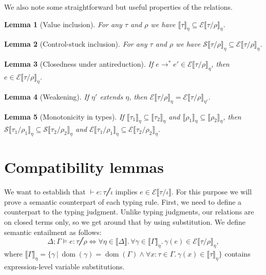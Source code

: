 \documentclass[a4paper, 11pt,titlepage, openright, twoside]{report}
\newcommand{\E}{\mathcal{E}}
\renewcommand{\S}{\mathcal{S}}
\newcommand{\Free}{\textrm{-}\mathrm{free}}
\DeclareMathOperator{\dom}{dom}
\newcommand{\+}{\enspace}
\newtheorem{lemma}{Lemma}
\begin{document}
We also note some straightforward but useful properties of the relations.
\begin{lemma}[Value inclusion]\label{value-inclusion}
	For any $τ$ and $ρ$ we have $⟦τ⟧_η ⊆ \E⟦τ/ρ⟧_η$.
\end{lemma}

\begin{lemma}[Control-stuck inclusion]\label{stuck-inclusion}
For any $τ$ and $ρ$ we have $\S⟦τ/ρ⟧_η ⊆ \E⟦τ/ρ⟧_η$.
\end{lemma}

\begin{lemma}[Closedness under antireduction]\label{antireduction}
If $e →^* e' ∈ \E⟦τ/ρ⟧_η$, then $e∈\E⟦τ/ρ⟧_η$.
\end{lemma}

\begin{lemma}[Weakening]\label{weakening}
	If $η'$ extends $η$,
	then $\E⟦τ/ρ⟧_η = \E⟦τ/ρ⟧_{η'}$.
\end{lemma}

\begin{lemma}[Monotonicity in types]\label{mono}
	If $⟦τ_1⟧_η ⊆ ⟦τ_2⟧_η$ and $⟦ρ_1⟧_η ⊆ ⟦ρ_2⟧_η$,
	then $\S⟦τ_1/ρ_1⟧_η ⊆ \S⟦τ_2/ρ_2⟧_η$
	and $\E⟦τ_1/ρ_1⟧_η ⊆ \E⟦τ_2/ρ_2⟧_η$.
\end{lemma}
%
%
%

\section{Compatibility lemmas}
We want to establish that $⊢ e : τ ╱ ι$ implies $e ∈ \E⟦τ/ι⟧$.
For this purpose we will prove a semantic counterpart of each typing rule.
First, we need to define a counterpart to the typing judgment.
Unlike typing judgments, our relations are on closed terms only,
so we get around that by using substitution.
We define semantic entailment as follows:
$$Δ;Γ ⊨ e : τ ╱ ρ ⇔ ∀η∈⟦Δ⟧.\, ∀γ∈⟦Γ⟧_η.\,γ(e) ∈ \E⟦τ/ρ⟧_η,$$
where $⟦Γ⟧_η = \{ γ │ \dom(γ) = \dom(Γ) ∧ ∀x:τ∈Γ.\,γ(x) ∈ ⟦τ⟧_η\}$ contains expression-level
variable substitutions.
\end{document}
